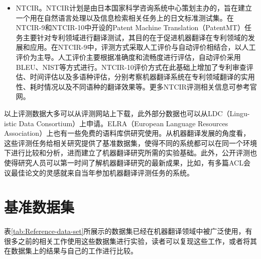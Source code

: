 \begin{appendices}
\begin{itemize}
\vspace{0.5em}
\item NTCIR。NTCIR计划是由日本国家科学咨询系统中心策划主办的，旨在建立一个用在自然语言处理以及信息检索相关任务上的日文标准测试集。在NTCIR-9和NTCIR-10中开设的Patent Machine Translation（PatentMT）任务主要针对专利领域进行翻译测试，其目的在于促进机器翻译在专利领域的发展和应用。在NTCIR-9中，评测方式采取人工评价与自动评价相结合，以人工评价为主导。人工评价主要根据准确度和流畅度进行评估，自动评价采用BLEU、NIST等方式进行。NTCIR-10评价方式在此基础上增加了专利审查评估、时间评估以及多语种评估，分别考察机器翻译系统在专利领域翻译的实用性、耗时情况以及不同语种的翻译效果等。更多NTCIR评测相关信息可参考官网。
\end{itemize}

\parinterval 以上评测数据大多可以从评测网站上下载，此外部分数据也可以从LDC（Lingu-istic Data Consortium）上申请。ELRA（European Language Resources Association）上也有一些免费的语料库供研究使用。从机器翻译发展的角度看，这些评测任务给相关研究提供了基准数据集，使得不同的系统都可以在同一个环境下进行比较和分析，进而建立了机器翻译研究所需的实验基础。此外，公开评测也使得研究人员可以第一时间了解机器翻译研究的最新成果，比如，有多篇ACL会议最佳论文的灵感就来自当年参加机器翻译评测任务的系统。


\section{基准数据集}
\parinterval 表\ref{tab:Reference-data-set}所展示的数据集已经在机器翻译领域中被广泛使用，有很多之前的相关工作使用这些数据集进行实验，读者可以复现这些工作，或者将其在数据集上的结果与自己的工作进行比较。


\end{appendices}

